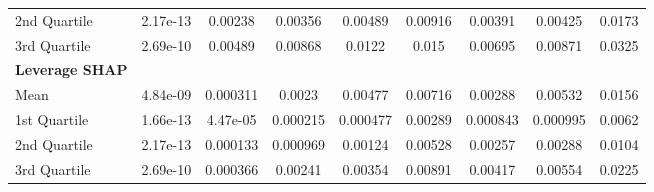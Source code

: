 {\begin{tabular} {lcccccccc}
\hspace{7pt}2nd Quartile & \cellcolor{gold!60}2.17e-13 & \cellcolor{silver!60}0.00238 & \cellcolor{silver!60}0.00356 & \cellcolor{silver!60}0.00489 & \cellcolor{silver!60}0.00916 & \cellcolor{silver!60}0.00391 & \cellcolor{silver!60}0.00425 & \cellcolor{silver!60}0.0173 \\ 
\hspace{7pt}3rd Quartile & \cellcolor{silver!60}2.69e-10 & \cellcolor{silver!60}0.00489 & \cellcolor{silver!60}0.00868 & \cellcolor{silver!60}0.0122 & \cellcolor{silver!60}0.015 & \cellcolor{silver!60}0.00695 & \cellcolor{silver!60}0.00871 & \cellcolor{silver!60}0.0325 \\ 
\addlinespace[1ex] 
\textbf{Leverage SHAP} &  &  &  &  &  &  &  &  \\ 
\hspace{7pt}Mean & \cellcolor{gold!60}4.84e-09 & \cellcolor{gold!60}0.000311 & \cellcolor{gold!60}0.0023 & \cellcolor{gold!60}0.00477 & \cellcolor{gold!60}0.00716 & \cellcolor{gold!60}0.00288 & \cellcolor{gold!60}0.00532 & \cellcolor{gold!60}0.0156 \\ 
\hspace{7pt}1st Quartile & \cellcolor{gold!60}1.66e-13 & \cellcolor{gold!60}4.47e-05 & \cellcolor{gold!60}0.000215 & \cellcolor{gold!60}0.000477 & \cellcolor{gold!60}0.00289 & \cellcolor{gold!60}0.000843 & \cellcolor{gold!60}0.000995 & \cellcolor{gold!60}0.0062 \\ 
\hspace{7pt}2nd Quartile & \cellcolor{silver!60}2.17e-13 & \cellcolor{gold!60}0.000133 & \cellcolor{gold!60}0.000969 & \cellcolor{gold!60}0.00124 & \cellcolor{gold!60}0.00528 & \cellcolor{gold!60}0.00257 & \cellcolor{gold!60}0.00288 & \cellcolor{gold!60}0.0104 \\ 
\hspace{7pt}3rd Quartile & \cellcolor{gold!60}2.69e-10 & \cellcolor{gold!60}0.000366 & \cellcolor{gold!60}0.00241 & \cellcolor{gold!60}0.00354 & \cellcolor{gold!60}0.00891 & \cellcolor{gold!60}0.00417 & \cellcolor{gold!60}0.00554 & \cellcolor{gold!60}0.0225 \\ 
\bottomrule
\end{tabular}}